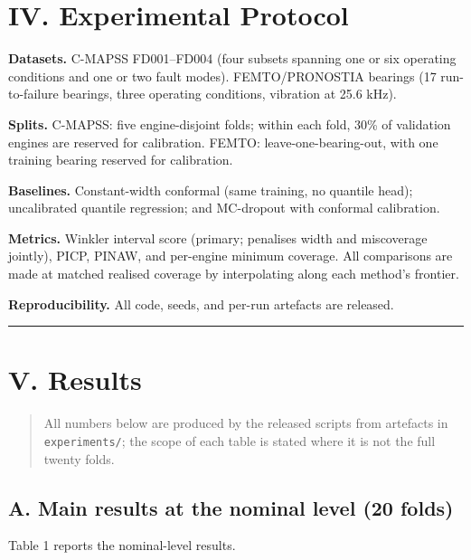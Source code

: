 \section{IV. Experimental Protocol}\label{iv.-experimental-protocol}

\textbf{Datasets.} C-MAPSS FD001--FD004 \citep{saxena2008} (four subsets spanning one or six operating conditions and one or two fault modes). FEMTO/PRONOSTIA bearings \citep{nectoux2012} (17 run-to-failure bearings, three operating conditions, vibration at 25.6 kHz).

\textbf{Splits.} C-MAPSS: five engine-disjoint folds; within each fold, 30\% of validation engines are reserved for calibration. FEMTO: leave-one-bearing-out, with one training bearing reserved for calibration.

\textbf{Baselines.} Constant-width conformal (same training, no quantile head); uncalibrated quantile regression; and MC-dropout with conformal calibration.

\textbf{Metrics.} Winkler interval score (primary; penalises width and miscoverage jointly), PICP, PINAW, and per-engine minimum coverage. All comparisons are made at matched realised coverage by interpolating along each method's frontier.

\textbf{Reproducibility.} All code, seeds, and per-run artefacts are released.

\begin{center}\rule{0.5\linewidth}{0.5pt}\end{center}

\section{V. Results}\label{v.-results}

\begin{quote}
All numbers below are produced by the released scripts from artefacts in \texttt{experiments/}; the scope of each table is stated where it is not the full twenty folds.
\end{quote}

\subsection{A. Main results at the nominal level (20 folds)}\label{a.-main-results-at-the-nominal-level-20-folds}

Table 1 reports the nominal-level results.

